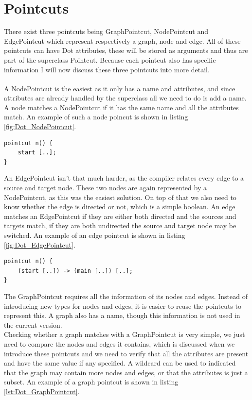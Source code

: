 \documentclass[a4paper]{report}
\begin{document}
\section{Pointcuts}
There exist three pointcuts being GraphPointcut, NodePointcut and EdgePointcut which represent respectively a graph, node and edge. All of these pointcuts can have Dot attributes, these will be stored as arguments and thus are part of the superclass Pointcut. Because each pointcut also has specific information I will now discuss these three pointcuts into more detail.\\
\\
A NodePointcut is the easiest as it only has a name and attributes, and since attributes are already handled by the superclass all we need to do is add a name. A node matches a NodePointcut if it has the same name and all the attributes match. An example of such a node poincut is shown in listing \ref{fig:Dot_NodePointcut}.
\begin{lstlisting}[caption=A node pointcut matching any node start, label=lst:Dot_NodePointcut]
pointcut n() {
	start [..];
}
\end{lstlisting}
An EdgePointcut isn't that much harder, as the compiler relates every edge to a source and target node. These two nodes are again represented by a NodePointcut, as this was the easiest solution. On top of that we also need to know whether the edge is directed or not, which is a simple boolean. An edge matches an EdgePointcut if they are either both directed and the sources and targets match, if they are both undirected the source and target node may be switched. An example of an edge pointcut is shown in listing \ref{fig:Dot_EdgePointcut}.
\begin{lstlisting}[caption=An edge pointcut matching any edge from start to main, label=lst:Dot_EdgePointcut]
pointcut n() {
	(start [..]) -> (main [..]) [..];
}
\end{lstlisting}
The GraphPointcut requires all the information of its nodes and edges. Instead of introducing new types for nodes and edges, it is easier to reuse the pointcuts to represent this. A graph also has a name, though this information is not used in the current version.\\
Checking whether a graph matches with a GraphPointcut is very simple, we just need to compare the nodes and edges it contains, which is discussed when we introduce these pointcuts and we need to verify that all the attributes are present and have the same value if any specified. A wildcard can be used to indicated that the graph may contain more nodes and edges, or that the attributes is just a subset. An example of a graph pointcut is shown in listing \ref{lst:Dot_GraphPointcut}.
\end{document}

